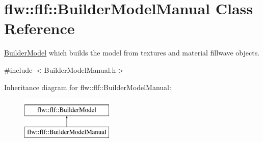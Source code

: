 \hypertarget{classflw_1_1flf_1_1BuilderModelManual}{}\section{flw\+:\+:flf\+:\+:Builder\+Model\+Manual Class Reference}
\label{classflw_1_1flf_1_1BuilderModelManual}


\hyperlink{classflw_1_1flf_1_1BuilderModel}{Builder\+Model} which builds the model from textures and material fillwave objects.  




{\ttfamily \#include $<$Builder\+Model\+Manual.\+h$>$}

Inheritance diagram for flw\+:\+:flf\+:\+:Builder\+Model\+Manual\+:\begin{figure}[H]
\begin{center}
\leavevmode
\includegraphics[height=2.000000cm]{classflw_1_1flf_1_1BuilderModelManual}
\end{center}
\end{figure}
